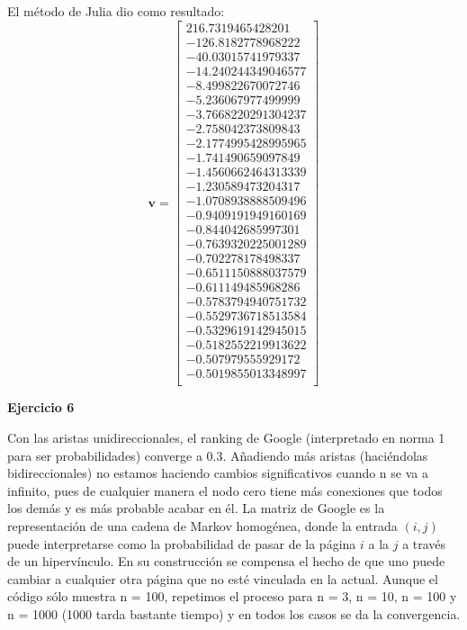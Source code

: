 \documentclass[11pt]{article}
\begin{document}
\begin{multicols}{3}
\noindent
El método de Julia dio como resultado:
$$
 \textbf{v} =
 \begin{bmatrix}
216.7319465428201 \\
-126.8182778968222 \\
-40.03015741979337 \\
-14.240244349046577 \\
-8.499822670072746 \\
-5.236067977499999 \\
-3.7668220291304237 \\
-2.758042373809843 \\
-2.1774995428995965 \\
-1.741490659097849 \\
-1.4560662464313339 \\
-1.230589473204317 \\
-1.0708938888509496 \\
-0.9409191949160169 \\
-0.844042685997301 \\
-0.7639320225001289 \\
-0.702278178498337 \\
-0.6511150888037579 \\
-0.611149485968286 \\
-0.5783794940751732 \\
-0.5529736718513584 \\
-0.5329619142945015 \\
-0.5182552219913622 \\
-0.507979555929172 \\
-0.5019855013348997 \\
\end{bmatrix}
$$
\end{multicols}

\newpage
\noindent
\textbf{Ejercicio 6}

\noindent
Con las aristas unidireccionales, el ranking de Google (interpretado en norma
1 para ser probabilidades) converge a 0.3.
Añadiendo más aristas (haciéndolas bidireccionales) no estamos haciendo
cambios significativos cuando n se va a infinito, pues de cualquier manera
el nodo cero tiene más conexiones que todos los demás y es más probable
acabar en él.
La matriz de Google es la representación de una cadena de Markov homogénea, donde
la entrada $(i, j)$ puede interpretarse como la probabilidad de pasar de la
página $i$ a la $j$ a través de un hipervínculo. En su construcción se compensa
el hecho de que uno puede cambiar a cualquier otra página que no esté vinculada
en la actual.
Aunque el código sólo muestra n = 100, repetimos el proceso para n = 3, n = 10,
n = 100 y n = 1000 (1000 tarda bastante tiempo) y en todos los casos se da la
convergencia.


\noindent
\end{document}

